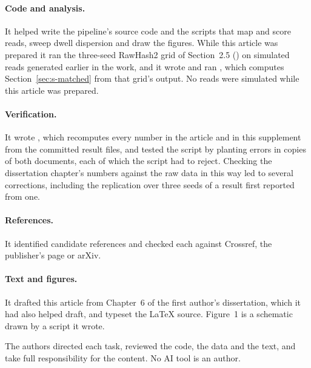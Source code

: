 \documentclass[11pt,a4paper]{article}
\begin{document}
\paragraph{Code and analysis.} It helped write the pipeline's source code and the scripts that map
and score reads, sweep dwell dispersion and draw the figures. While this article was prepared it ran
the three-seed RawHash2 grid of Section~2.5 () on simulated
reads generated earlier in the work, and it wrote and ran , which
computes Section~\ref{sec:s-matched} from that grid's output. No reads were simulated while this
article was prepared.

\paragraph{Verification.} It wrote , which recomputes
every number in the article and in this supplement from the committed result files, and tested the
script by planting errors in copies of both documents, each of which the script had to reject.
Checking the dissertation chapter's numbers against the raw data in this way led to several
corrections, including the replication over three seeds of a result first reported from one.

\paragraph{References.} It identified candidate references and checked each against Crossref, the
publisher's page or arXiv.

\paragraph{Text and figures.} It drafted this article from Chapter~6 of the first author's
dissertation, which it had also helped draft, and typeset the LaTeX source. Figure~1 is a schematic
drawn by a script it wrote.

The authors directed each task, reviewed the code, the data and the text, and take full
responsibility for the content. No AI tool is an author.
\end{document}
